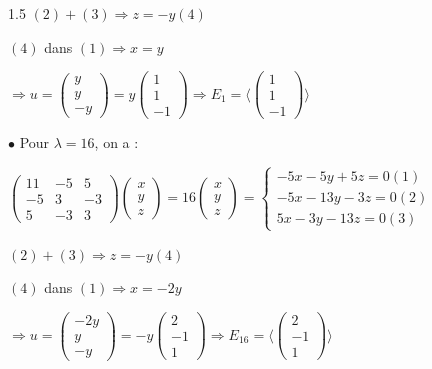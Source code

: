 \documentclass[12pt]{article}
\begin{document}
\begin{spacing}{1.5}
$(2)+(3)\Rightarrow z=-y (4)$

$(4)$ dans $(1)\Longrightarrow x=y$

$\Rightarrow u=\begin{pmatrix}
y\\
y\\
-y
\end{pmatrix}=y\begin{pmatrix}
1\\
1\\
-1
\end{pmatrix}\Rightarrow E_{1}=\langle \begin{pmatrix}
1 \\
1 \\
-1
\end{pmatrix}\rangle$

$\bullet$ Pour $\lambda=16$, on a :

$\begin{pmatrix}
11 & -5 & 5 \\ 
-5 & 3 & -3 \\ 
5 & -3 & 3
\end{pmatrix}\begin{pmatrix}
x\\
y\\
z
\end{pmatrix}=16\begin{pmatrix}
x\\
y\\
z
\end{pmatrix}=\begin{cases}
-5x-5y+5z=0(1)\\
-5x-13y-3z=0(2)\\
5x-3y-13z=0(3)
\end{cases}$

$(2)+(3)\Rightarrow z=-y (4)$

$(4)$ dans $(1)\Longrightarrow x=-2y$

$\Rightarrow u=\begin{pmatrix}
-2y\\
y\\
-y
\end{pmatrix}=-y\begin{pmatrix}
2\\
-1\\
1
\end{pmatrix}\Rightarrow E_{16}=\langle \begin{pmatrix}
2 \\
-1 \\
1
\end{pmatrix}\rangle$



\end{spacing}
\end{document}
